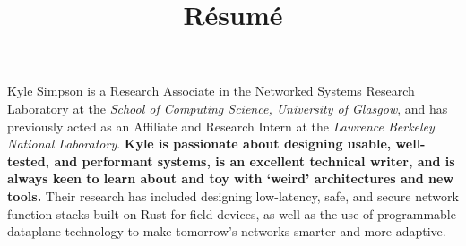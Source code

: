 \documentclass[10pt, a4paper]{moderncv}
\title{R\'{e}sum\'{e}}
\begin{document}
\nocite{*}

\setlength{\hintscolumnwidth}{1.5cm}
\setlength{\separatorcolumnwidth}{1em}
	
\makecvtitle
\vspace{-2.5em}

\begin{multicols*}{2}
\setlength{\maincolumnwidth}{\linewidth-\leftskip-\rightskip-\separatorcolumnwidth-\hintscolumnwidth}

Kyle Simpson is a Research Associate in the Networked Systems Research Laboratory at the \emph{School of Computing Science, University of Glasgow}, and has previously acted as an Affiliate and Research Intern at the \emph{Lawrence Berkeley National Laboratory}.
\textbf{Kyle is passionate about designing usable, well-tested, and performant systems, is an excellent technical writer, and is always keen to learn about and toy with `weird' architectures and new tools.}
Their research has included designing low-latency, safe, and secure network function stacks built on Rust for field devices, as well as the use of programmable dataplane technology to make tomorrow's networks smarter and more adaptive.



%
%





\newcolumn





%



\end{multicols*}
\end{document}
